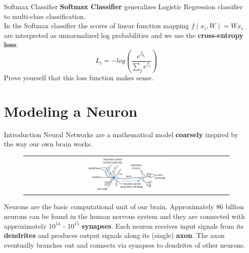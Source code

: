 \documentclass[aspectratio=169]{beamer}
\begin{document}

\begin{frame}{Softmax Classifier}
\textbf{Softmax Classifier} generalizes Logistic Regression classifier to multi-class classification.\\
\vspace{0.2cm}
In the Softmax classifier the scores of linear function mapping $f(x_i,W) = Wx_i$ are interpreted as unnormalized log probabilities and we use the \textbf{cross-entropy loss}:
\begin{equation*}
L_i = -log\left(\frac{e^{f_{y_{i}}}}{\sum_j e^{f_{j}}}\right)
\end{equation*}
\small{Prove yourself that this loss function makes sense.}

\end{frame}


\section{Modeling a Neuron}

\begin{frame}{Introduction}
Neural Networks are a mathematical model \textbf{coarsely} inspired by the way our own brain works.
\begin{figure}
\begin{tabular}{c}
\includegraphics[width=0.4\textwidth]{img/dnn/biological_neuron.jpg}
\end{tabular}
\end{figure}
\small{Neurons are the basic computational unit of our brain. Approximately 86 billion neurons can be found in the human nervous system and they are connected with approximately $10^{14}$ - $10^{15}$ \textbf{synapses}. Each neuron receives input signals from its \textbf{dendrites} and produces output signals along its (single) \textbf{axon}. The axon eventually branches out and connects via synapses to dendrites of other neurons.}
\end{frame}
\end{document}
